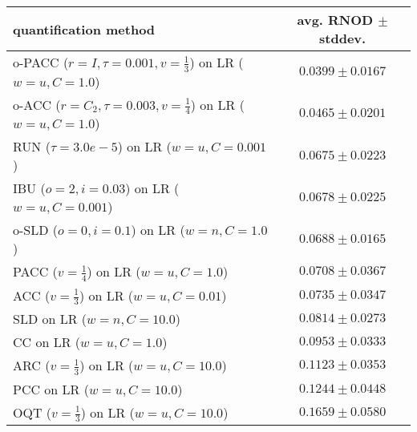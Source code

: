 \begin{tabular}{lc}
  \toprule
  quantification method & avg. RNOD $\pm$ stddev. \\
  \midrule
  o-PACC ($r=I, \tau=0.001, v=\frac{1}{3}$) on LR ($w=u, C=1.0$) & $\mathbf{0.0399 \pm 0.0167}$ \\
  o-ACC ($r=C_2, \tau=0.003, v=\frac{1}{4}$) on LR ($w=u, C=1.0$) & $0.0465 \pm 0.0201$ \\
  RUN ($\tau=3.0e-5$) on LR ($w=u, C=0.001$) & $0.0675 \pm 0.0223$ \\
  IBU ($o=2, i=0.03$) on LR ($w=u, C=0.001$) & $0.0678 \pm 0.0225$ \\
  o-SLD ($o=0, i=0.1$) on LR ($w=n, C=1.0$) & $0.0688 \pm 0.0165$ \\
  PACC ($v=\frac{1}{4}$) on LR ($w=u, C=1.0$) & $0.0708 \pm 0.0367$ \\
  ACC ($v=\frac{1}{3}$) on LR ($w=u, C=0.01$) & $0.0735 \pm 0.0347$ \\
  SLD on LR ($w=n, C=10.0$) & $0.0814 \pm 0.0273$ \\
  CC on LR ($w=u, C=1.0$) & $0.0953 \pm 0.0333$ \\
  ARC ($v=\frac{1}{3}$) on LR ($w=u, C=10.0$) & $0.1123 \pm 0.0353$ \\
  PCC on LR ($w=u, C=10.0$) & $0.1244 \pm 0.0448$ \\
  OQT ($v=\frac{1}{3}$) on LR ($w=u, C=10.0$) & $0.1659 \pm 0.0580$ \\
  \bottomrule
\end{tabular}
